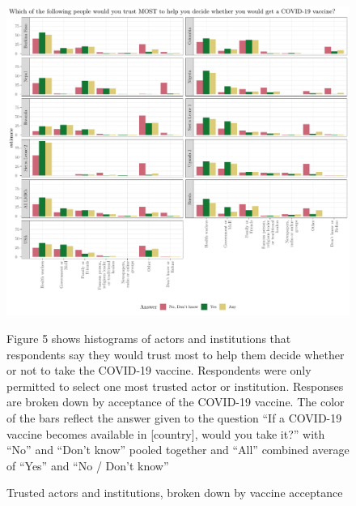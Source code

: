 \documentclass[
  12pt,
]{article}
\begin{document}
\pagebreak

\begin{figure}[!ht]
\caption{Trusted actors and institutions, broken down by vaccine acceptance \label{fig:genderhist}}

\includegraphics{paper_files/figure-latex/histcattrust-1.pdf}

\scriptsize{Figure 5 shows histograms of actors and institutions that respondents say they would trust most to help them decide whether or not to take the COVID-19 vaccine. Respondents were only permitted to select one most trusted  actor or institution. Responses are broken down by acceptance of the COVID-19 vaccine. The color of the bars reflect the answer given to the question ``If a COVID-19 vaccine becomes available in [country], would you take it?'' with ``No'' and ``Don't know'' pooled together and ``All'' combined average of ``Yes'' and ``No / Don't know''}
\end{figure}

\pagebreak
\end{document}
